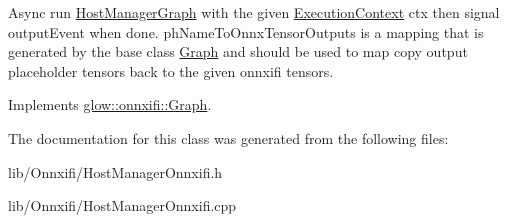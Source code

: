 Async run \hyperlink{classglow_1_1onnxifi_1_1_host_manager_graph}{Host\+Manager\+Graph} with the given \hyperlink{classglow_1_1_execution_context}{Execution\+Context} {\ttfamily ctx} then signal {\ttfamily output\+Event} when done. {\ttfamily ph\+Name\+To\+Onnx\+Tensor\+Outputs} is a mapping that is generated by the base class \hyperlink{classglow_1_1onnxifi_1_1_graph}{Graph} and should be used to map copy output placeholder tensors back to the given onnxifi tensors. 

Implements \hyperlink{classglow_1_1onnxifi_1_1_graph}{glow\+::onnxifi\+::\+Graph}.



The documentation for this class was generated from the following files\+:\begin{DoxyCompactItemize}
\item 
lib/\+Onnxifi/Host\+Manager\+Onnxifi.\+h\item 
lib/\+Onnxifi/Host\+Manager\+Onnxifi.\+cpp\end{DoxyCompactItemize}
